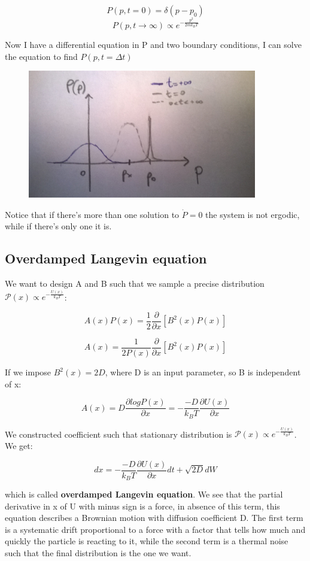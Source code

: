 \documentclass[a4paper, italian, openany]{book}
\begin{document}
$$P(p, t=0) = \delta(p-p_0)$$
$$P(p, t \to \infty) \propto e^{-\frac{p^2}{2mk_B T}}$$

Now I have a differential equation in P and two boundary conditions, I can solve the equation to find $P(p, t= \Delta t)$

\begin{figure}[H]
\centering
\includegraphics[width=100mm]{img/pic28.jpg}
\end{figure}

Notice that if there's more than one solution to $\dot{P}=0$ the system is not ergodic, while if there's only one it is.

\subsection{Overdamped Langevin equation}

We want to design A and B such that we sample a precise distribution $\mathcal{P}(x) \propto e^{-\frac{U(x)}{k_B T}}$:

$$A(x)P(x) = \frac{1}{2} \frac{\partial}{\partial x} \left [ B^2(x)P(x) \right ]$$

$$A(x) = \frac{1}{2P(x)}\frac{\partial}{\partial x} \left [ B^2(x)P(x) \right ]$$

If we impose $B^2(x) = 2D$, where D is an input parameter, so B is independent of x:

$$A(x) = D\frac{\partial log P(x)}{\partial x} = - \frac{-D}{k_B T}\frac{\partial U(x)}{\partial x}$$

We constructed coefficient such that stationary distribution is $\mathcal{P}(x) \propto e^{-\frac{U(x)}{k_B T}}$. We get:

$$dx = - \frac{-D}{k_B T}\frac{\partial U(x)}{\partial x} dt + \sqrt{2D} dW$$

which is called \textbf{overdamped Langevin equation}. We see that the partial derivative in x of U with minus sign is a force, in absence of this term, this equation describes a Brownian motion with diffusion coefficient D.\newline
The first term is a systematic drift proportional to a force with a factor that tells how much and quickly the particle is reacting to it, while the second term is a thermal noise such that the final distribution is the one we want.
\end{document}
